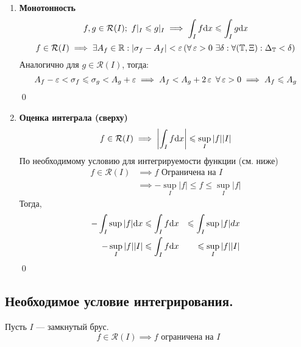 \documentclass[a4paper, 10pt]{article}
\begin{document}
\begin{enumerate}
\item \textbf{Монотонность}
\begin{equation*}
    f, g\in \mathcal{R}(I);\ f|_I\leqslant g|_I \implies \int_If\text{d}x \leqslant \int_Ig\text{d}x
\end{equation*}
\proof
    \begin{equation*}
        f\in \mathcal{R}(I) \implies \exists A_f\in \operatorname{\mathbb{R}} : |\sigma_f - A_f| < \operatorname{\varepsilon}\, (\forall \operatorname{\varepsilon} > 0\ \exists\delta: \forall(\operatorname{\mathbb{T}}, \Xi): \Delta_{\operatorname{\mathbb{T}}} < \delta)
    \end{equation*}
    Аналогично для $g\in \mathcal{R}(I)$, тогда:
    \begin{equation*}
    \begin{aligned}
        A_f - \operatorname{\varepsilon} < \sigma_f \leqslant \sigma_g < A_g + \operatorname{\varepsilon} \implies
        A_f < A_g + 2\operatorname{\varepsilon}\ \forall \operatorname{\varepsilon} > 0 \implies A_f \leqslant A_g
    \end{aligned}
    \end{equation*}
\qed
\item \textbf{Оценка интеграла (сверху)}
\begin{equation*}
    f\in \mathcal{R}(I) \implies \left|\int_If\text{d}x\right| \leqslant\sup\limits_{I}|f||I|
\end{equation*}
\proof
По необходимому условию для интегрируемости функции (см. ниже)
\begin{equation*}
    \begin{aligned}
        f\in \mathcal{R}(I) &\implies f \text{ Ограничена на } I\\
        &\implies -\sup_I|f| \leqslant f \leqslant \sup_I|f|
    \end{aligned}
\end{equation*}
Тогда,
\begin{equation*}
    \begin{aligned}
        -\int_I\sup|f|\text{d}x &\leqslant \int_If\text{d}x &\leqslant\int_I\sup|f|dx\\
        -\sup_I|f||I|&\leqslant \int_If\text{d}x&\leqslant \sup_I|f||I|
    \end{aligned}
\end{equation*}
\qed
\end{enumerate}


\subsection{Необходимое условие интегрирования.}
\theorem Пусть $I$ — замкнутый брус. 
\begin{equation*}
    f\in \mathcal{R}(I) \implies f \text{ ограничена на } I
\end{equation*}
\end{document}
